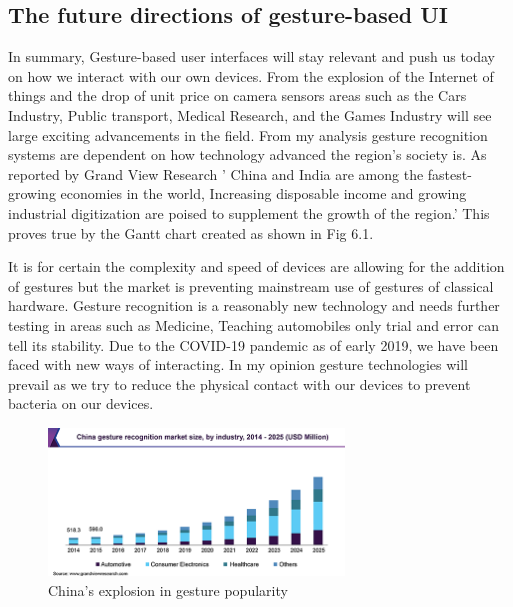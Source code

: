 \subsection{The  future directions of gesture-based UI}

In summary, Gesture-based user interfaces will stay relevant and push us today on how we interact with our own devices. From the explosion of the Internet of things and the drop of unit price on camera sensors areas such as the Cars Industry, Public transport, Medical Research, and the Games Industry will see large exciting advancements in the field. From my analysis gesture recognition systems are dependent on how technology advanced the region's society is. As reported by Grand View Research  ' China and India are among the fastest-growing economies in the world,  Increasing disposable income and growing industrial digitization are poised to supplement the growth of the region.' This proves true by the Gantt chart created as shown in Fig 6.1.



It is for certain the complexity and speed of devices are allowing for the addition of gestures but the market is preventing mainstream use of gestures of classical hardware. Gesture recognition is a reasonably new technology and needs further testing in areas such as Medicine, Teaching automobiles only trial and error can tell its stability. Due to the COVID-19 pandemic as of early 2019, we have been faced with new ways of interacting. In my opinion gesture technologies will prevail as we try to reduce the physical contact with our devices to prevent bacteria on our devices.



 \begin{figure}[h!]
  \centering
    \includegraphics[width=0.7\textwidth]{Research-Latex/images/futureOfGestures.png}
     \caption{China's explosion in gesture popularity}
\end{figure}